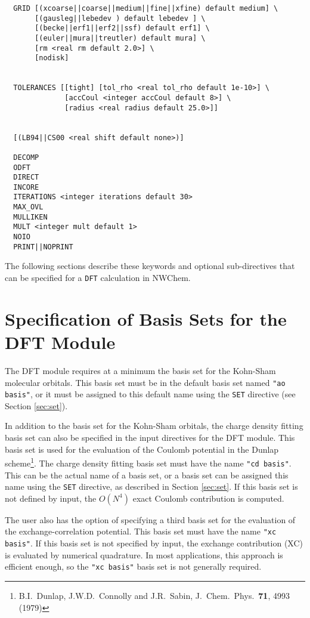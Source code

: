 \begin{verbatim}
  GRID [(xcoarse||coarse||medium||fine||xfine) default medium] \
       [(gausleg||lebedev ) default lebedev ] \
       [(becke||erf1||erf2||ssf) default erf1] \
       [(euler||mura||treutler) default mura] \
       [rm <real rm default 2.0>] \
       [nodisk]
        

  TOLERANCES [[tight] [tol_rho <real tol_rho default 1e-10>] \
              [accCoul <integer accCoul default 8>] \
              [radius <real radius default 25.0>]]


  [(LB94||CS00 <real shift default none>)]

  DECOMP
  ODFT
  DIRECT
  INCORE
  ITERATIONS <integer iterations default 30>
  MAX_OVL
  MULLIKEN
  MULT <integer mult default 1>
  NOIO
  PRINT||NOPRINT
\end{verbatim}

The following 
sections describe these keywords and
optional sub-directives that can be specified for a \verb+DFT+ calculation
in NWChem.

\section{Specification of Basis Sets for the DFT Module}

The DFT module requires at a minimum the basis set for the Kohn-Sham 
molecular orbitals.  This basis set must be in the default basis set named
{\tt "ao basis"}, or it must be assigned to this default name using the
\verb+SET+ directive (see Section \ref{sec:set}).

In addition to the basis set for the Kohn-Sham orbitals, 
the charge density fitting basis set can also be specified in the 
input directives for the DFT module.  This basis set is used for the 
evaluation of the Coulomb potential in the Dunlap scheme\footnote{B.I.~Dunlap, 
J.W.D.~Connolly and J.R.~Sabin, J.~Chem.~Phys.~{\bf 71},  4993 (1979)}.
The charge density fitting basis set must have the name {\tt "cd basis"}.
This can be the actual name of a basis set, or a basis set can be 
assigned this name using the \verb+SET+ directive, as described in
Section \ref{sec:set}.  If this basis set is not defined by input,
the $O(N^4)$ exact Coulomb contribution is computed.

The user also has the option of specifying a third basis set for the 
evaluation of the exchange-correlation potential.  This basis set must
have the name {\tt "xc basis"}.  If this basis set is not specified
by input, the exchange contribution (XC) is evaluated by numerical
quadrature.  In most applications, this approach is efficient enough,
so the {\tt "xc basis"} basis set is not generally required.

